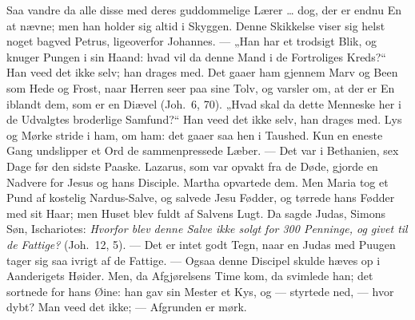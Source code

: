 \documentclass[12pt,a4paper]{book}
\begin{document}
Saa vandre da alle disse med deres guddommelige Lærer \dots{} dog, der er endnu En at
nævne; men han holder sig altid i Skyggen. Denne Skikkelse viser sig helst noget bagved
Petrus, ligeoverfor Johannes. --- „Han har et trodsigt Blik, og knuger Pungen i sin Haand:
hvad vil da denne Mand i de Fortroliges Kreds?“ Han veed det ikke selv; han drages med. Det
gaaer ham gjennem Marv og Been som Hede og Frost, naar Herren seer paa sine Tolv, og
varsler om, at der er En iblandt dem, som er en Diævel (Joh.\ 6, 70). „Hvad skal da dette
Menneske her i de Udvalgtes broderlige Samfund?“ Han veed det ikke selv, han drages med.
Lys og Mørke stride i ham, om ham: det gaaer saa hen i Taushed. Kun en eneste Gang
undslipper et Ord de sammenpressede Læber. --- Det var i Bethanien, sex Dage før den
sidste Paaske. Lazarus, som var opvakt fra de Døde, gjorde en Nadvere for Jesus og hans
Disciple. Martha opvartede dem. Men Maria tog et Pund af kostelig Nardus-Salve, og salvede
Jesu Fødder, og tørrede hans Fødder med sit Haar; men Huset blev fuldt af Salvens Lugt. Da
sagde Judas, Simons Søn, Ischariotes: \emph{Hvorfor blev denne Salve ikke solgt for 300
Penninge, og givet til de Fattige?} (Joh.\ 12, 5). --- Det er intet godt Tegn, naar en
Judas med Puugen tager sig saa ivrigt af de Fattige. --- Ogsaa denne Discipel skulde hæves
op i Aanderigets Høider. Men, da Afgjørelsens Time kom, da svimlede han; det sortnede for
hans Øine: han gav sin Mester et Kys, og --- styrtede ned, --- hvor dybt? Man veed det
ikke; --- Afgrunden er mørk.
\end{document}
